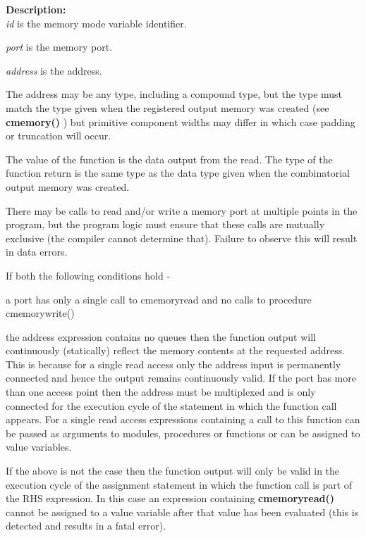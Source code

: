         {\bf Description:} \\
        {\em id} is the memory mode variable identifier.
        
        {\em port} is the memory port.
        
        {\em address} is the address.
        
        The address may be any type, including a compound type, but the type
        must match the type given when the registered output memory
        was created (see {\bf cmemory()} ) but primitive component
        widths may differ in which case padding or truncation will occur.
             
        The value of the function is the data output from the read. The type of
        the function return is the same type as the data type given when the
        combinatorial output memory was created.
        
        There may be calls to read and/or write a memory port at multiple
        points in the program, but the program logic must ensure that these
        calls are mutually exclusive (the compiler cannot determine that).
        Failure to observe this will result in data errors.
        
        If both the following conditions hold -
        \blist
        \item   a port has only a single call to cmemoryread and no calls to
                procedure cmemorywrite()
        \item   the address expression contains no queues
        \blend
        then the function output will continuously (statically) reflect the
        memory contents at the requested address. This is because for a single
        read access only the address input is permanently connected and hence
        the output remains continuously valid. If the port has more than one
        access point then the address must be multiplexed and is only
        connected for the execution cycle of the statement in which the
        function call appears. For a single read access expressions containing
        a call to this function can be passed as arguments to modules,
        procedures or functions or can be assigned to value variables.

        If the above is not the case then the function output will only be
        valid in the execution cycle of the assignment statement in which the
        function call is part of the RHS expression. In this case an expression
        containing {\bf cmemoryread()} cannot be assigned to a value variable
        after that value has been evaluated (this is detected and results in
        a fatal error).
        
